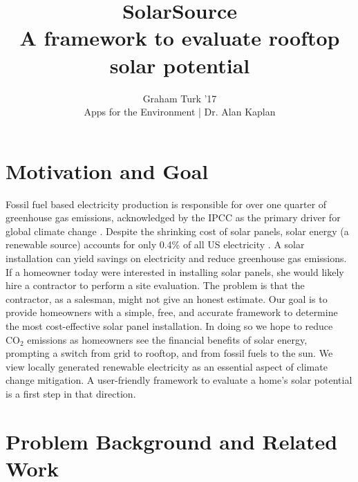 \documentclass[pageno]{jpaper}
\begin{document}
\title{{\huge SolarSource} \\ {\large A framework to evaluate rooftop solar potential}}
\author{Graham Turk '17 \\ {\normalsize Apps for the Environment | Dr. Alan Kaplan}}

\date{}
\maketitle

\thispagestyle{empty}

\section{Motivation and Goal}
\indent Fossil fuel based electricity production is responsible for over one quarter of greenhouse gas emissions, acknowledged by the IPCC as the primary driver for global climate change \cite{IPCC}. Despite the shrinking cost of solar panels, solar energy (a renewable source) accounts for only 0.4\% of all US electricity \cite{USEIA}. A solar installation can yield savings on electricity and reduce greenhouse gas emissions. \newline
\indent If a homeowner today were interested in installing solar panels, she would likely hire a contractor to perform a site evaluation. The problem is that the contractor, as a salesman, might not give an honest estimate. Our goal is to provide homeowners with a simple, free, and accurate framework to determine the most cost-effective solar panel installation. In doing so we hope to reduce $\mbox{CO}_2$ emissions as homeowners see the financial benefits of solar energy, prompting a switch from grid to rooftop, and from fossil fuels to the sun. We view locally generated renewable electricity as an essential aspect of climate change mitigation. A user-friendly framework to evaluate a home's solar potential is a first step in that direction.

\section{Problem Background and Related Work}
\end{document}
